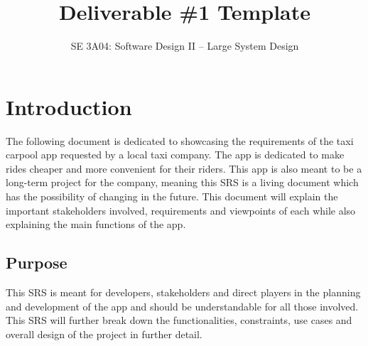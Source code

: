 \documentclass[]{article}
\title{Deliverable \#1 Template}
\author{SE 3A04: Software Design II -- Large System Design}
\date{}
\begin{document}
\maketitle	

\section{Introduction}
\label{sec:introduction}

The following document is dedicated to showcasing the requirements of the taxi carpool app requested by a local taxi company. The app is dedicated to make rides cheaper and more convenient for their riders. This app is also meant to be a long-term project for the company, meaning this SRS is a living document which has the possibility of changing in the future. This document will explain the important stakeholders involved, requirements and viewpoints of each while also explaining the main functions of the app.

\subsection{Purpose}
\label{sub:purpose}
This SRS is meant for developers, stakeholders and direct players in the planning and development of the app and should be understandable for all those involved. This SRS will further break down the functionalities, constraints, use cases and overall design of the project in further detail. 

\end{document}
